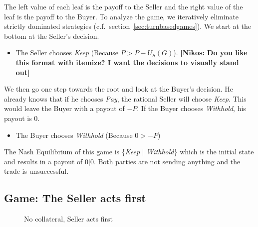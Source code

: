 \documentclass{cacthesis}
\newcommand{\authnote}[3]{{ \footnotesize \textbf{#1[#2: #3]~}}}
\newcommand{\niknote}[1]{\authnote{\color{red}}{Nikos}{#1}}
\begin{document}
The left value of each leaf is the payoff to the Seller and the right value of the leaf is the payoff to the Buyer. To analyze the game, we iteratively eliminate strictly dominated strategies (c.f.\ section~\ref{sec:turnbasedgames}). We start at the bottom at the Seller's decision.
\begin{itemize}
    \item The Seller chooses \emph{Keep} (Because $P > P - U_S(G)$).\niknote{Do you like this format with itemize? I want the decisions to visually stand out}
\end{itemize}
    We then go one step towards the root and look at the Buyer's decision. He already knows that if he chooses \emph{Pay}, the rational Seller will choose \emph{Keep}. This would leave the Buyer with a payout of $-P$. If the Buyer chooses \emph{Withhold}, his payout is $0$.
\begin{itemize}
    \item The Buyer chooses \emph{Withhold} (Because $0 > -P$)
\end{itemize} 
The Nash Equilibrium of this game is \{\emph{Keep} $|$ \emph{Withhold}\} which is the initial state and results in a payout of $0|0$. Both parties are not sending anything and the trade is unsuccessful. 

\subsection{Game: The Seller acts first} 

\begin{figure}[htb!]
\centering
\label{fig:nocol-Seller-first}
\caption{No collateral, Seller acts first}
\end{figure}
\end{document}
